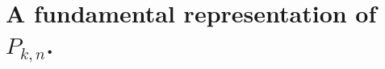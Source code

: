 \documentclass[reqno]{amsart}
\newtheorem{lemma}[theorem]{Lemma}
\theoremstyle{definition}
\theoremstyle{remark}
\numberwithin{equation}{section}
\DeclareMathOperator{\tr}{Tr}
\DeclareMathOperator{\End}{End}
\begin{document}



\section{A fundamental  representation of $P_{k,n}$.} \label{section_Pi}
\end{document}
